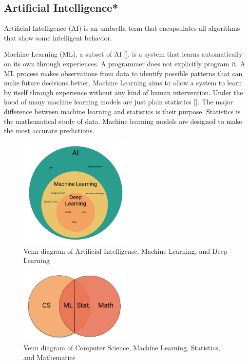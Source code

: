 \subsection{Artificial Intelligence*}
Artificial Intelligence (AI) is an umbrella term that encapsulates all algorithms that
show some intelligent behavior.

Machine Learning (ML), a subset of AI [], is a system that learns automatically on its own through experiences.
A programmer does not explicitly program it. A ML process makes observations from data to identify possible
patterns that can make future decisions better. Machine Learning aims to allow a system to learn by itself through
experience without any kind of human intervention. Under the hood of many machine learning models are just plain statistics [].
The major difference between machine learning and statistics is their purpose.
Statistics is the mathematical study of data.
Machine learning models are designed to make the most accurate predictions.


\begin{figure}[h!]
  \centering
  \includegraphics[width=0.5\textwidth]{./figs/illustrations/illustration_venn_diagram_ml_deep_learning.png}
  \hfill
  \caption{Venn diagram of Artificial Intelligense, Machine Learning, and Deep Learning}
  \label{fig:venn-diagram-ml-deep-learning}
\end{figure}
\begin{figure}[h!]
  \centering
  \includegraphics[width=0.5\textwidth]{./figs/illustrations/illustration_venn_diagram_cs_ml_stat_math.png}
  \hfill
  \caption{Venn diagram of Computer Science, Machine Learning, Statistics, and Mathematics}
  \label{fig:venn-diagram-cs-ml-deep-learning}
\end{figure}